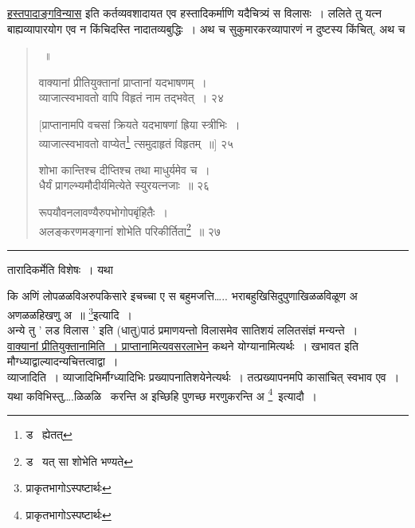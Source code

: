 \documentclass[11pt, openany]{book}
\begin{document}
\underline{हस्तपादाङ्गविन्यास} इति कर्तव्यवशादायत एव हस्तादिकर्माणि यदैचित्र्यं स विलासः~। ललिते तु यत्न बाह्यव्यापारयोग एव न किंचिदस्ति नादातव्यबुद्धिः~। अथ च सुकुमारकरव्यापारणं न दुष्टस्य किंचित्, अथ च 


\newpage
\lfoot{}

\begin{quote}
 {\na [करचरणाङ्कन्यासः सभ्रूनेत्रोष्ठसंप्रयुक्तस्तु~। \\
 सुकुमारविधानेन स्त्रीभिरितीदं स्मृतं ललितम् ]~॥ 

 वाक्यानां प्रीतियुक्तानां प्राप्तानां यदभाषणम्~।\\ 
 व्याजात्स्वभावतो वापि विहृतं नाम तद्भवेत्~। २४ 

 [प्राप्तानामपि वचसां क्रियते यदभाषणां ह्रिया स्त्रीभिः~। \\
 व्याजात्स्वभावतो वाप्येत\renewcommand{\thefootnote}{1}\footnote{ड \textendash\ ह्येतत्} त्समुदाहृतं विहृतम्~॥] २५ 

 शोभा कान्तिश्च दीप्तिश्च तथा माधुर्यमेव च~।\\ 
 धैर्यं प्रागल्भ्यमौदीर्यमित्येते स्युरयत्नजाः~॥ २६ 

 रूपयौवनलावण्यैरुपभोगोपबृंहितैः~।\\
 अलङ्करणमङ्गानां शोभेति परिकीर्तिता\renewcommand{\thefootnote}{2}\footnote{ड \textendash\ यत् सा शोभेति भण्यते }~॥ २७ }
\end{quote}

\hrule

\vspace{2mm}

\noindent
तारादिकर्मेति विशेषः~। यथा\textendash\ 

कि अणिं लोपळळविअरुपकिसारे इचच्चा ए स बहुमजत्ति\ldots .. भराबहुखिसिदुपुणाखिळळविळूण अ अणळळहिखणु अ~॥ \renewcommand{\thefootnote}{*}\footnote{प्राकृतभागोऽस्पष्टार्थः }इत्यादि~।\\ 

अन्ये तु ' लड विलास ' इति (धातु)पाठं प्रमाणयन्तो विलासमेव सातिशयं ललितसंज्ञं मन्यन्ते~। \\

 \underline{वाक्यानां प्रीतियुक्तानामिति~। प्राप्तानामित्यवसरलाभेन} कथने योग्यानामित्यर्थः~। खभावत इति मौग्ध्याद्वाल्यादन्यचित्तत्वाद्वा~। \\

व्याजादिति~। व्याजादिभिर्मौग्ध्यादिभिः प्रख्यापनातिशयेनेत्यर्थः~। {तत्प्रख्यापनमपि कासांचित् स्वभाव एव~। यथा कविभिस्तु\ldots .ळिळळि\textendash\ } करन्ति अ इच्छिहि पुणच्छ मरणुकरन्ति अ \renewcommand{\thefootnote}{*}\footnote{प्राकृतभागोऽस्पष्टार्थः }\textendash\ इत्यादौ~।\\ 
\end{document}
